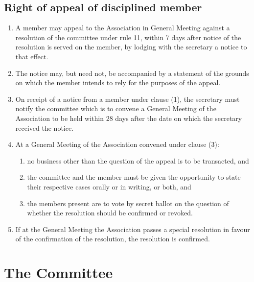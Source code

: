 \documentclass{article}
\begin{document}
\subsection{Right of appeal of disciplined member}
\begin{enumerate}
    \item A member may appeal to the Association in General Meeting against a resolution of the committee under rule 11, within 7 days after notice of the resolution is served on the member, by lodging with the secretary a notice to that effect.
    \item The notice may, but need not, be accompanied by a statement of the grounds on which the member intends to rely for the purposes of the appeal.
    \item On receipt of a notice from a member under clause (1), the secretary must notify the committee which is to convene a General Meeting of the Association to be held within 28 days after the date on which the secretary received the notice.
    \item At a General Meeting of the Association convened under clause (3): 
    \begin{enumerate}
        \item no business other than the question of the appeal is to be transacted, and
        \item the committee and the member must be given the opportunity to state their respective cases orally or in writing, or both, and
        \item the members present are to vote by secret ballot on the question of whether the resolution should be confirmed or revoked.
    \end{enumerate}
    \item If at the General Meeting the Association passes a special resolution in favour of the confirmation of the resolution, the resolution is confirmed.
\end{enumerate}
\section{The Committee}
\end{document}
